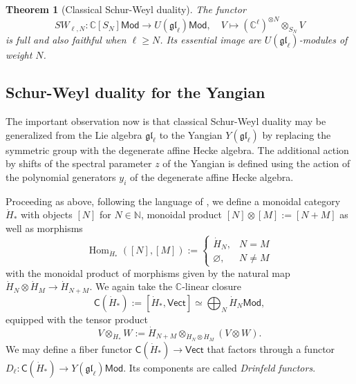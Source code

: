 \documentclass[11pt]{report}
\newtheorem{theorem}{Theorem}[section]
\theoremstyle{definition}
\theoremstyle{remark}
\theoremstyle{remark}
\newcommand{\Hom}{\operatorname{Hom}}
\newcommand{\N}{\mathbb{N}}
\newcommand{\C}{\mathbb{C}}
\begin{document}
\begin{theorem}[Classical Schur-Weyl duality]
The functor
\begin{equation*}
SW_{\ell,N}: \C[S_N]\mathsf{Mod} \to U(\mathfrak{gl}_\ell)\mathsf{Mod}, \quad V \mapsto (\C^\ell)^{\otimes N} \otimes_{S_N} V
\end{equation*}
is full and also faithful when $\ell \geq N$. Its essential image are $U(\mathfrak{gl}_\ell)$-modules of weight $N$.
\end{theorem}

\subsection{Schur-Weyl duality for the Yangian}

The important observation now is that classical Schur-Weyl duality may be generalized from the Lie algebra $\mathfrak{gl}_\ell$ to the Yangian $Y(\mathfrak{gl}_\ell)$ by replacing the symmetric group with the degenerate affine Hecke algebra. The additional action by shifts of the spectral parameter $z$ of the Yangian is defined using the action of the polynomial generators $y_i$ of the degenerate affine Hecke algebra.

Proceeding as above, following the language of \cite{article:davydov:2010}, we define a monoidal category $\dot H_*$ with objects $[N]$ for $N \in \N$, monoidal product $[N] \otimes [M] := [N+M]$ as well as morphisms
\begin{equation*}
\Hom_{\dot H_*}([N],[M]) :=
\begin{cases}
\dot H_N, & N = M \\
\varnothing, & N \neq M
\end{cases}
\end{equation*}
with the monoidal product of morphisms given by the natural map $\dot H_N \otimes \dot H_M \to \dot H_{N+M}$. We again take the $\C$-linear closure
\begin{equation*}
\mathsf{C}(\dot H_*) := [\dot H_*,\mathsf{Vect}] \simeq \bigoplus_N \dot H_N\mathsf{Mod},
\end{equation*}
equipped with the tensor product
\begin{equation*}
V \otimes_{\dot H_*} W := \dot H_{N+M} \otimes_{\dot H_N \otimes \dot H_M} (V \otimes W).
\end{equation*}
We may define a fiber functor $\mathsf{C}(\dot H_*) \to \mathsf{Vect}$ that factors through a functor $D_\ell: \mathsf{C}(\dot H_*) \to Y(\mathfrak{gl}_\ell)\mathsf{Mod}$. Its components are called \emph{Drinfeld functors}.
\end{document}

